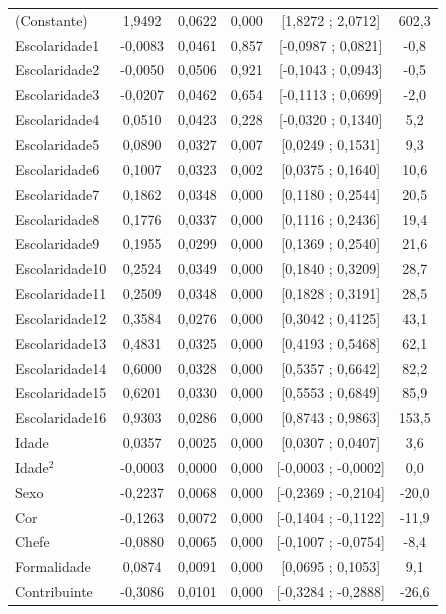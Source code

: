 \documentclass[12pt,a4paper,header]{abnt}
\begin{document}
\begin{center}
\begin{longtable}{lccccc}
(Constante) & 1,9492 & 0,0622 & 0,000 & [1,8272 ; 2,0712] & 602,3 \\
Escolaridade1 & -0,0083 & 0,0461 & 0,857 & [-0,0987 ; 0,0821] & -0,8 \\
Escolaridade2 & -0,0050 & 0,0506 & 0,921 & [-0,1043 ; 0,0943] & -0,5 \\
Escolaridade3 & -0,0207 & 0,0462 & 0,654 & [-0,1113 ; 0,0699] & -2,0 \\
Escolaridade4 & 0,0510 & 0,0423 & 0,228 & [-0,0320 ; 0,1340] & 5,2 \\
Escolaridade5 & 0,0890 & 0,0327 & 0,007 & [0,0249 ; 0,1531] & 9,3 \\
Escolaridade6 & 0,1007 & 0,0323 & 0,002 & [0,0375 ; 0,1640] & 10,6 \\
Escolaridade7 & 0,1862 & 0,0348 & 0,000 & [0,1180 ; 0,2544] & 20,5 \\
Escolaridade8 & 0,1776 & 0,0337 & 0,000 & [0,1116 ; 0,2436] & 19,4 \\
Escolaridade9 & 0,1955 & 0,0299 & 0,000 & [0,1369 ; 0,2540] & 21,6 \\
Escolaridade10 & 0,2524 & 0,0349 & 0,000 & [0,1840 ; 0,3209] & 28,7 \\
Escolaridade11 & 0,2509 & 0,0348 & 0,000 & [0,1828 ; 0,3191] & 28,5 \\
Escolaridade12 & 0,3584 & 0,0276 & 0,000 & [0,3042 ; 0,4125] & 43,1 \\
Escolaridade13 & 0,4831 & 0,0325 & 0,000 & [0,4193 ; 0,5468] & 62,1 \\
Escolaridade14 & 0,6000 & 0,0328 & 0,000 & [0,5357 ; 0,6642] & 82,2 \\
Escolaridade15 & 0,6201 & 0,0330 & 0,000 & [0,5553 ; 0,6849] & 85,9 \\
Escolaridade16 & 0,9303 & 0,0286 & 0,000 & [0,8743 ; 0,9863] & 153,5 \\
Idade & 0,0357 & 0,0025 & 0,000 & [0,0307 ; 0,0407] & 3,6 \\
Idade$^2$ & -0,0003 & 0,0000 & 0,000 & [-0,0003 ; -0,0002] & 0,0 \\
Sexo & -0,2237 & 0,0068 & 0,000 & [-0,2369 ; -0,2104] & -20,0 \\
Cor & -0,1263 & 0,0072 & 0,000 & [-0,1404 ; -0,1122] & -11,9 \\
Chefe & -0,0880 & 0,0065 & 0,000 & [-0,1007 ; -0,0754] & -8,4 \\
Formalidade & 0,0874 & 0,0091 & 0,000 & [0,0695 ; 0,1053] & 9,1 \\
Contribuinte & -0,3086 & 0,0101 & 0,000 & [-0,3284 ; -0,2888] & -26,6 \\

\end{longtable}
\end{center}
\end{document}
